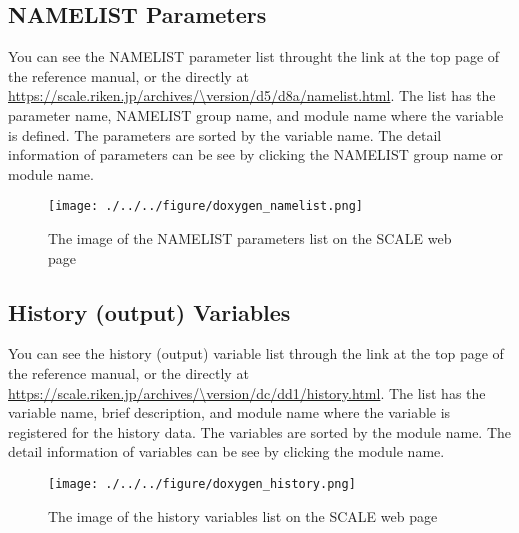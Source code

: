 \newpage
\subsection{NAMELIST Parameters}
You can see the NAMELIST parameter list throught the link at the top page of the reference manual, or the directly at \url{https://scale.riken.jp/archives/\version/d5/d8a/namelist.html}.
The list has the parameter name, NAMELIST group name, and module name where the variable is defined.
The parameters are sorted by the variable name.
The detail information of parameters can be see by clicking the NAMELIST group name or module name.

\begin{figure}[h]
\begin{center}
  \texttt{[image: ./../../figure/doxygen\_namelist.png]}\\
  \caption{The image of the NAMELIST parameters list on the SCALE web page }
  \label{fig:doxygen_namelist}
\end{center}
\end{figure}


\newpage
\subsection{History (output) Variables}
You can see the history (output) variable list through the link at the top page of the reference manual, or the directly at \url{https://scale.riken.jp/archives/\version/dc/dd1/history.html}.
The list has the variable name, brief description, and module name where the variable is registered for the history data.
The variables are sorted by the module name.
The detail information of variables can be see by clicking the module name.

\begin{figure}[h]
\begin{center}
  \texttt{[image: ./../../figure/doxygen\_history.png]}\\
  \caption{The image of the history variables list on the SCALE web page }
  \label{fig:doxygen_history}
\end{center}
\end{figure}
